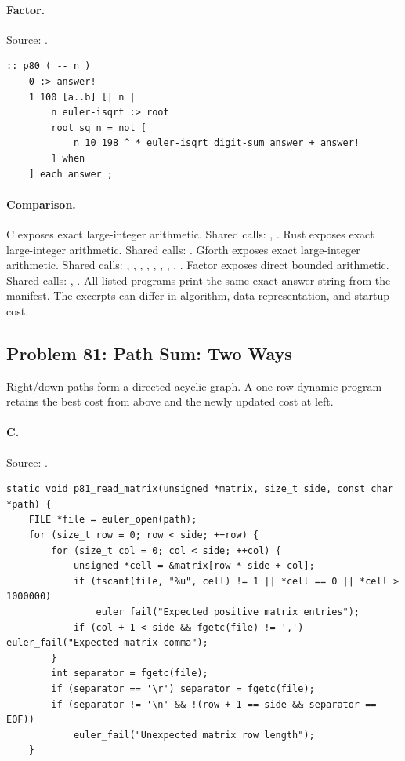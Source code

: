 \paragraph{Factor.} Source: .
\begin{lstlisting}
:: p80 ( -- n )
    0 :> answer!
    1 100 [a..b] [| n |
        n euler-isqrt :> root
        root sq n = not [
            n 10 198 ^ * euler-isqrt digit-sum answer + answer!
        ] when
    ] each answer ;
\end{lstlisting}

\paragraph{Comparison.}
C exposes exact large-integer arithmetic. Shared calls: \texttt{}, \texttt{}. Rust exposes exact large-integer arithmetic. Shared calls: \texttt{}. Gforth exposes exact large-integer arithmetic. Shared calls: \texttt{}, \texttt{}, \texttt{}, \texttt{}, \texttt{}, \texttt{}, \texttt{}, \texttt{}, \texttt{}. Factor exposes direct bounded arithmetic. Shared calls: \texttt{}, \texttt{}.
All listed programs print the same exact answer string from the manifest. The excerpts can differ in algorithm, data representation, and startup cost.

\subsection{Problem 81: Path Sum: Two Ways}
\label{walkthrough:p81}
Right/down paths form a directed acyclic graph. A one-row dynamic program retains the best cost from above and the newly updated cost at left.

\paragraph{C.} Source: .
\begin{lstlisting}
static void p81_read_matrix(unsigned *matrix, size_t side, const char *path) {
    FILE *file = euler_open(path);
    for (size_t row = 0; row < side; ++row) {
        for (size_t col = 0; col < side; ++col) {
            unsigned *cell = &matrix[row * side + col];
            if (fscanf(file, "%u", cell) != 1 || *cell == 0 || *cell > 1000000)
                euler_fail("Expected positive matrix entries");
            if (col + 1 < side && fgetc(file) != ',') euler_fail("Expected matrix comma");
        }
        int separator = fgetc(file);
        if (separator == '\r') separator = fgetc(file);
        if (separator != '\n' && !(row + 1 == side && separator == EOF))
            euler_fail("Unexpected matrix row length");
    }
\end{lstlisting}


